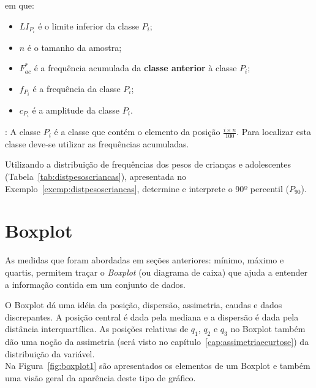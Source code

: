 \documentclass[11pt,fleqn]{book} %
\begin{document}
\noindent em que: \\

\begin{itemize}
\item $LI_{P_i}$ é o limite inferior da classe $P_i$;
\item $n$ é o tamanho da amostra;
\item $F_{ac}^*$ é a frequência acumulada da {\bf classe anterior} à classe $P_i$;
\item $f_{P_i}$ é a frequência da classe $P_i$;
\item $c_{P_i}$ é a amplitude da classe $P_i$. \\

\end{itemize}

: A classe $P_i$ é a classe que contém o elemento da posição $\frac{i \times n}{100}$. Para localizar esta classe deve-se utilizar as frequências acumuladas. \\

\begin{exercise}
Utilizando a distribuição de frequências dos pesos de crianças e adolescentes (Tabela~\ref{tab:distpesoscriancas}), apresentada no Exemplo~\ref{exemp:distpesoscriancas}, determine e interprete o 90º percentil ($P_{90}$). 

\end{exercise}



\section{Boxplot}

As medidas que foram abordadas em seções anteriores: mínimo, máximo e quartis, permitem traçar o {\itshape Boxplot} (ou diagrama de caixa) que ajuda a entender a informação contida em um conjunto de dados.

O Boxplot dá uma idéia da posição, dispersão, assimetria, caudas e dados discrepantes. A posição central é dada pela mediana e a dispersão é dada pela distância interquartílica. As posições relativas de $q_1$, $q_2$ e $q_3$ no Boxplot também dão uma noção da assimetria (será visto no capítulo~\ref{cap:assimetriaecurtose}) da distribuição da variável. \\

Na Figura~\ref{fig:boxplot1} são apresentados os elementos de um Boxplot e também uma visão geral da aparência deste tipo de gráfico. 
\end{document}
